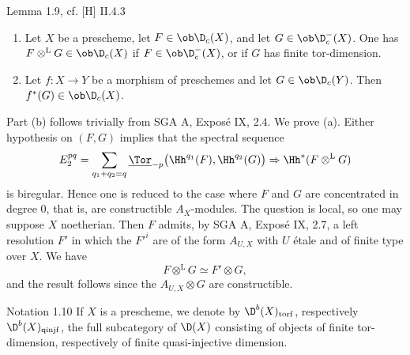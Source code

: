 \begin{statement}{Lemma 1.9, cf. [H] II.4.3}
\begin{enumerate}[label=\alph*)]
\item Let $X$ be a prescheme, let $F\in\ob\D_c(X)$, and let $G\in\ob\D_c^-(X)$. One has $F\otimes^{\mathrm L}G\in\ob\D_c(X)$ if $F\in\ob\D_c^-(X)$, or if $G$ has finite tor-dimension.
\item Let $f:X\to Y$ be a morphism of preschemes and let $G\in\ob\D_c(Y)$. Then $f^*(G)\in\ob\D_c(X)$.
\end{enumerate}
\end{statement}

\begin{prooftext}
Part (b) follows trivially from SGA A, Exposé IX, 2.4. We prove (a). Either hypothesis on $(F,G)$ implies that the spectral sequence
\[
   E_2^{pq}=\sum_{q_1+q_2=q}\underline{\Tor}_{-p}\bigl(\Hh^{q_1}(F),\Hh^{q_2}(G)\bigr)
       \Rightarrow \Hh^*(F\otimes^{\mathrm L}G)
\]
is biregular. Hence one is reduced to the case where $F$ and $G$ are concentrated in degree $0$, that is, are constructible $A_X$-modules. The question is local, so one may suppose $X$ noetherian. Then $F$ admits, by SGA A, Exposé IX, 2.7, a left resolution $F'$ in which the $F'^i$ are of the form $A_{U,X}$ with $U$ étale and of finite type over $X$. We have
\[
   F\otimes^{\mathrm L}G\simeq F'\otimes G,
\]
and the result follows since the $A_{U,X}\otimes G$ are constructible. \qedtext
\end{prooftext}

\begin{statement}{Notation 1.10}
If $X$ is a prescheme, we denote by $\D^b(X)_{\mathrm{torf}}$, respectively $\D^b(X)_{\mathrm{qinjf}}$, the full subcategory of $\D(X)$ consisting of objects of finite tor-dimension, respectively of finite quasi-injective dimension.
\end{statement}

